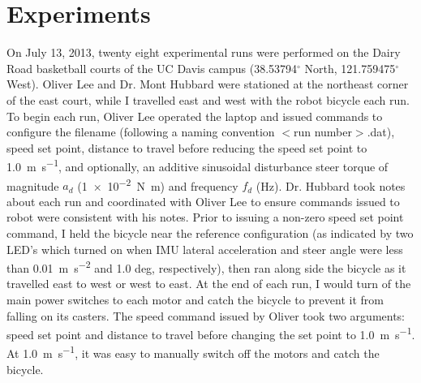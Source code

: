 \section{Experiments} \label{rb:sec:experiments}

On July 13, 2013, twenty eight experimental runs were performed on the Dairy
Road basketball courts of the UC Davis campus (38.53794$^{\circ}$ North,
121.759475$^{\circ}$ West). Oliver Lee and Dr. Mont Hubbard were stationed at
the northeast corner of the east court, while I travelled east and west with
the robot bicycle each run. To begin each run, Oliver Lee operated the laptop
and issued commands to configure the filename (following a naming convention
$<$run number$>$.dat), speed set point, distance to travel before reducing the
speed set point to \SI{1.0}{\m\per\s}, and optionally, an additive sinusoidal
disturbance steer torque of magnitude $a_d$ (\SI{1e-2}{\N\m}) and frequency
$f_d$ (\si{\Hz}). Dr. Hubbard took notes about each run and coordinated with
Oliver Lee to ensure commands issued to robot were consistent with his notes.
Prior to issuing a non-zero speed set point command, I held the bicycle near
the reference configuration (as indicated by two LED's which turned on when IMU
lateral acceleration and steer angle were less than \SI{0.01}{\m\per\s\squared}
and 1.0 deg, respectively), then ran along side the bicycle as it travelled
east to west or west to east. At the end of each run, I would turn of the main
power switches to each motor and catch the bicycle to prevent it from falling
on its casters.  The speed command issued by Oliver took two arguments: speed
set point and distance to travel before changing the set point to
\SI{1.0}{\m\per\s}. At \SI{1.0}{\m\per\s}, it was easy to manually switch off
the motors and catch the bicycle.

